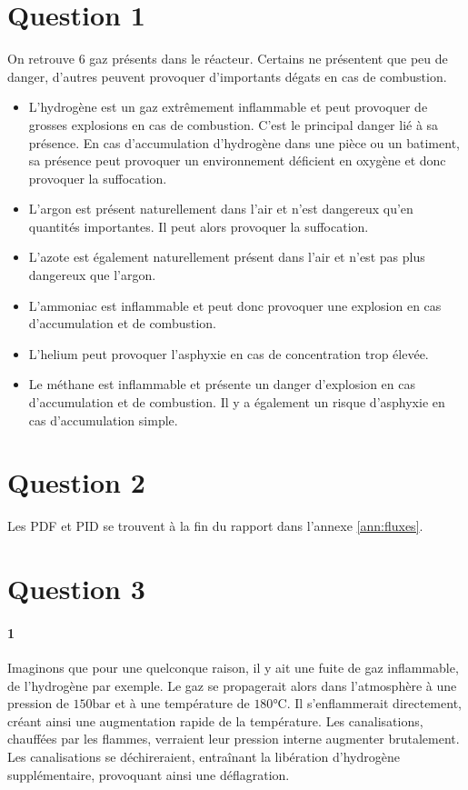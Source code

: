 
\section*{Question 1}

On retrouve $6$ gaz présents dans le réacteur. 
Certains ne présentent que peu de danger, 
d'autres peuvent provoquer d'importants dégats en cas de combustion.

\begin{itemize}	
	\item L'hydrogène est un gaz extrêmement inflammable et peut provoquer de grosses 
		explosions en cas de combustion. C'est le principal danger lié à sa présence. 
		En cas d'accumulation d'hydrogène dans une pièce ou un batiment, 
		sa présence peut provoquer un environnement déficient en oxygène et 
		donc provoquer la suffocation.

	\item  L'argon est présent naturellement dans l'air et n'est dangereux qu'en 
		quantités importantes. Il peut alors provoquer la suffocation.

	\item  L'azote est également naturellement présent dans l'air et n'est pas plus 
		dangereux que l'argon.

	\item  L'ammoniac est inflammable et peut donc provoquer une explosion en cas 
		d'accumulation et de combustion.

	\item  L'helium peut provoquer l'asphyxie en cas de concentration trop élevée.

	\item  Le méthane est inflammable et présente un danger d'explosion en cas 
		d'accumulation et de combustion. Il y a également un risque d'asphyxie en 
		cas d'accumulation simple.
\end{itemize}

\section*{Question 2}

Les PDF et PID se trouvent à la fin du rapport dans l'annexe \ref{ann:fluxes}.


\section*{Question 3}

\paragraph{1} Imaginons que pour une quelconque raison, il y ait une fuite de gaz inflammable, 
de l'hydrogène par exemple. Le gaz se propagerait alors dans l'atmosphère à 
une pression de $150\si{\bar}$ et à une température de $180\si{\celsius}$. 
Il s'enflammerait directement, créant ainsi une augmentation rapide de la température. 
Les canalisations, chauffées par les flammes, verraient leur pression interne augmenter 
brutalement. Les canalisations se déchireraient, entraînant la libération d'hydrogène 
supplémentaire, provoquant ainsi une déflagration.

